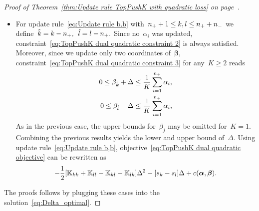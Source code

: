 \begin{proof}[Proof of Theorem~\ref{thm:Update rule TopPushK with quadratic loss} on page~\pageref{thm:Update rule TopPushK with quadratic loss}]
\begin{itemize}
    \item For update rule~\eqref{eq:Update rule b,b} with~$n_{+} + 1\le k,l \le n_{+} + n_{-}$ we define~$\hat{k} = k - n_{+},$~$\hat{l} = l - n_{+}.$ Since no~$\alpha_i$ was updated, constraint~\eqref{eq:TopPushK dual quadratic constraint 2} is always satisfied. Moreover, since we update only two coordinates of~$\bm{\beta},$ constraint~\eqref{eq:TopPushK dual quadratic constraint 3} for any~$K \geq 2$ reads
    \begin{equation}\label{eq: TopPushK dual quadratic b,b - bounds}
      \begin{aligned}
        0 \leq \beta_{\hat{k}} + \Delta \leq \frac{1}{K} \sum_{i = 1}^{n_{+}} \alpha_i, \\
        0 \leq \beta_{\hat{l}} - \Delta \leq \frac{1}{K} \sum_{i = 1}^{n_{+}} \alpha_i,
      \end{aligned}
    \end{equation}
    As in the previous case, the upper bounds for~$\beta_j$ may be omitted for~$K = 1$. Combining the previous results yields the lower and upper bound of~$\Delta.$ Using update rule~\eqref{eq:Update rule b,b}, objective~\eqref{eq:TopPushK dual quadratic objective} can be rewritten as
    \begin{equation*}
      - \frac{1}{2} \Brac[s]{\K_{kk} + \K_{ll} - \K_{kl} - \K_{lk}} \Delta^2 - \Brac[s]{s_k - s_l} \Delta + c(\bm{\alpha}, \bm{\beta}).
    \end{equation*}
  \end{itemize}
  The proofs follows by plugging these cases into the solution~\eqref{eq:Delta_optimal}.
\end{proof}


\subsection{\PatMat}

